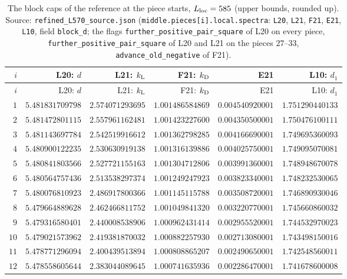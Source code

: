 {\scriptsize\setlength{\tabcolsep}{6pt}\renewcommand{\arraystretch}{0.92}
\begin{longtable}{@{}rrrrrr@{}}
\caption{The block caps of the reference at the piece starts, $L_{\rm loc}=585$ (upper bounds, rounded up). Source: \texttt{refined\_L570\_source.json} (\texttt{middle.pieces[i].local.spectra}: \texttt{L20}, \texttt{L21}, \texttt{F21}, \texttt{E21}, \texttt{L10}, field \texttt{block\_d}; the flags \texttt{further\_positive\_pair\_square} of L20 on every piece, \texttt{further\_positive\_pair\_square} of L20 and L21 on the pieces $27$--$33$, \texttt{advance\_old\_negative} of F21).}\label{tab:data:cut-caps}\\
\toprule
$i$ & L20: $d$ & L21: $k_{\rm L}$ & F21: $k_{\rm D}$ & E21 & L10: $d_1$\\
\midrule
\endfirsthead
\toprule
$i$ & L20: $d$ & L21: $k_{\rm L}$ & F21: $k_{\rm D}$ & E21 & L10: $d_1$\\
\midrule
\endhead
\bottomrule
\endfoot
$1$ & $5.481831709798$ & $2.574071293695$ & $1.001486584869$ & $0.004540920001$ & $1.751290440133$\\
$2$ & $5.481472801115$ & $2.557961162481$ & $1.001423227600$ & $0.004350500001$ & $1.750476100111$\\
$3$ & $5.481143697784$ & $2.542519916612$ & $1.001362798285$ & $0.004166690001$ & $1.749695360093$\\
$4$ & $5.480900122235$ & $2.530630919138$ & $1.001316139886$ & $0.004025750001$ & $1.749095070081$\\
$5$ & $5.480841803566$ & $2.527721155163$ & $1.001304712806$ & $0.003991360001$ & $1.748948670078$\\
$6$ & $5.480564757436$ & $2.513538297374$ & $1.001249247923$ & $0.003823340001$ & $1.748232530065$\\
$7$ & $5.480076810923$ & $2.486917800366$ & $1.001145115788$ & $0.003508720001$ & $1.746890930046$\\
$8$ & $5.479664889628$ & $2.462466811752$ & $1.001049841320$ & $0.003220770001$ & $1.745660860032$\\
$9$ & $5.479316580401$ & $2.440008538906$ & $1.000962431414$ & $0.002955520001$ & $1.744532970023$\\
$10$ & $5.479021573962$ & $2.419381870032$ & $1.000882257930$ & $0.002713080001$ & $1.743498150016$\\
$11$ & $5.478771296094$ & $2.400439513894$ & $1.000808865207$ & $0.002490650001$ & $1.742548560011$\\
$12$ & $5.478558605644$ & $2.383044089645$ & $1.000741635936$ & $0.002286470001$ & $1.741678600008$\\

\end{longtable}}
